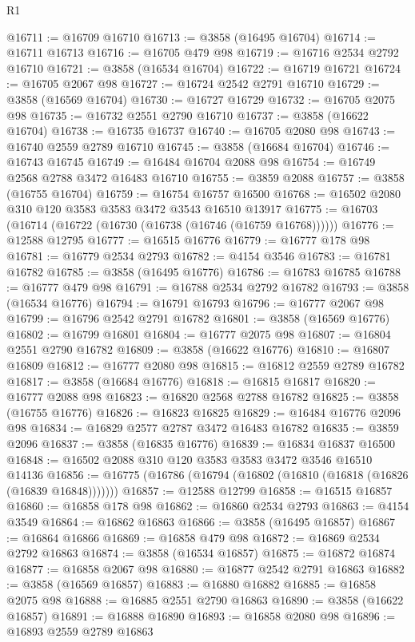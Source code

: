 \begin{lexlean}{R1}
\begin{coremodule}
@16711 := @16709 @16710
@16713 := @3858 (@16495 @16704)
@16714 := @16711 @16713
@16716 := @16705 @479 @98
@16719 := @16716 @2534 @2792 @16710
@16721 := @3858 (@16534 @16704)
@16722 := @16719 @16721
@16724 := @16705 @2067 @98
@16727 := @16724 @2542 @2791 @16710
@16729 := @3858 (@16569 @16704)
@16730 := @16727 @16729
@16732 := @16705 @2075 @98
@16735 := @16732 @2551 @2790 @16710
@16737 := @3858 (@16622 @16704)
@16738 := @16735 @16737
@16740 := @16705 @2080 @98
@16743 := @16740 @2559 @2789 @16710
@16745 := @3858 (@16684 @16704)
@16746 := @16743 @16745
@16749 := @16484 @16704 @2088 @98
@16754 := @16749 @2568 @2788 @3472 @16483 @16710
@16755 := @3859 @2088
@16757 := @3858 (@16755 @16704)
@16759 := @16754 @16757 @16500
@16768 := @16502 @2080 @310 @120 @3583 @3583 @3472 @3543 @16510 @13917
@16775 := @16703 (@16714 (@16722 (@16730 (@16738 (@16746 (@16759 @16768))))))
@16776 := @12588 @12795
@16777 := @16515 @16776
@16779 := @16777 @178 @98
@16781 := @16779 @2534 @2793
@16782 := @4154 @3546
@16783 := @16781 @16782
@16785 := @3858 (@16495 @16776)
@16786 := @16783 @16785
@16788 := @16777 @479 @98
@16791 := @16788 @2534 @2792 @16782
@16793 := @3858 (@16534 @16776)
@16794 := @16791 @16793
@16796 := @16777 @2067 @98
@16799 := @16796 @2542 @2791 @16782
@16801 := @3858 (@16569 @16776)
@16802 := @16799 @16801
@16804 := @16777 @2075 @98
@16807 := @16804 @2551 @2790 @16782
@16809 := @3858 (@16622 @16776)
@16810 := @16807 @16809
@16812 := @16777 @2080 @98
@16815 := @16812 @2559 @2789 @16782
@16817 := @3858 (@16684 @16776)
@16818 := @16815 @16817
@16820 := @16777 @2088 @98
@16823 := @16820 @2568 @2788 @16782
@16825 := @3858 (@16755 @16776)
@16826 := @16823 @16825
@16829 := @16484 @16776 @2096 @98
@16834 := @16829 @2577 @2787 @3472 @16483 @16782
@16835 := @3859 @2096
@16837 := @3858 (@16835 @16776)
@16839 := @16834 @16837 @16500
@16848 := @16502 @2088 @310 @120 @3583 @3583 @3472 @3546 @16510 @14136
@16856 := @16775 (@16786 (@16794 (@16802 (@16810 (@16818 (@16826 (@16839 @16848)))))))
@16857 := @12588 @12799
@16858 := @16515 @16857
@16860 := @16858 @178 @98
@16862 := @16860 @2534 @2793
@16863 := @4154 @3549
@16864 := @16862 @16863
@16866 := @3858 (@16495 @16857)
@16867 := @16864 @16866
@16869 := @16858 @479 @98
@16872 := @16869 @2534 @2792 @16863
@16874 := @3858 (@16534 @16857)
@16875 := @16872 @16874
@16877 := @16858 @2067 @98
@16880 := @16877 @2542 @2791 @16863
@16882 := @3858 (@16569 @16857)
@16883 := @16880 @16882
@16885 := @16858 @2075 @98
@16888 := @16885 @2551 @2790 @16863
@16890 := @3858 (@16622 @16857)
@16891 := @16888 @16890
@16893 := @16858 @2080 @98
@16896 := @16893 @2559 @2789 @16863

\end{coremodule}
\end{lexlean}

